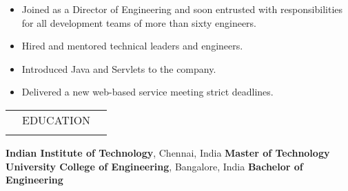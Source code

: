 \documentclass[a4paper, 13pt,line]{article}
\begin{document}
\begin{itemize}
\item Joined as a Director of Engineering and soon entrusted with
responsibilities for all development teams of more than sixty engineers.
\item Hired and mentored technical leaders and engineers.
\item Introduced Java and Servlets to the company.
\item Delivered a new web-based service meeting strict deadlines.
\end{itemize}

\begin{table}[H]
{\renewcommand{\arraystretch}{1.9}
\begin{tabularx}{\textwidth}{XcX}
\hline\hline\Xhline{2.5\arrayrulewidth}
\rowcolor{Gray}      &EDUCATION& \\
\Xhline{2.5\arrayrulewidth}
\hline
\end{tabularx}
}
\end{table}

\noindent\textbf{Indian Institute of Technology}, Chennai, India \hfill \textbf{Master of Technology}\vspace{1mm}\\
\textbf{University College of Engineering}, Bangalore, India \hfill \textbf{Bachelor of Engineering}\vspace{-1.5mm}\\%
\end{document}
